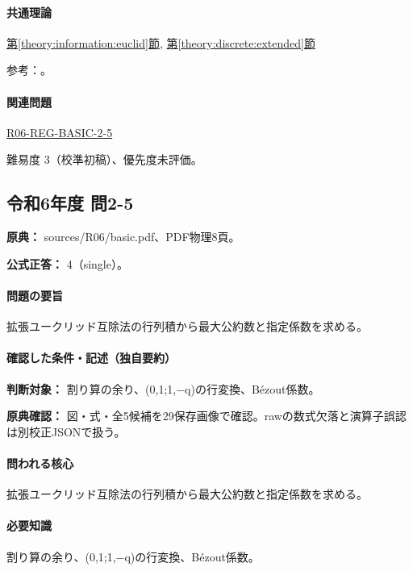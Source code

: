 \paragraph{共通理論} \hyperref[theory:information:euclid]{第\ref*{theory:information:euclid}節}, \hyperref[theory:discrete:extended]{第\ref*{theory:discrete:extended}節}

\par 参考：\cite{mit_discrete2015}。

\paragraph{関連問題} \hyperref[q:r06-reg-basic-2-5]{R06-REG-BASIC-2-5}

\par 難易度 3（校準初稿）、優先度未評価。

\subsection{令和6年度 問2-5}
\label{q:r06-reg-basic-2-5}

\noindent\textbf{原典：} sources/R06/basic.pdf、PDF物理8頁。

\textbf{公式正答：} 4（single）。

\paragraph{問題の要旨} 拡張ユークリッド互除法の行列積から最大公約数と指定係数を求める。

\paragraph{確認した条件・記述（独自要約）}\mbox{}\par

\noindent\textbf{判断対象：} 割り算の余り、(0,1;1,−q)の行変換、Bézout係数。\par

\noindent\textbf{原典確認：} 図・式・全5候補を29保存画像で確認。rawの数式欠落と演算子誤認は別校正JSONで扱う。\par

\paragraph{問われる核心} 拡張ユークリッド互除法の行列積から最大公約数と指定係数を求める。

\paragraph{必要知識} 割り算の余り、(0,1;1,−q)の行変換、Bézout係数。

